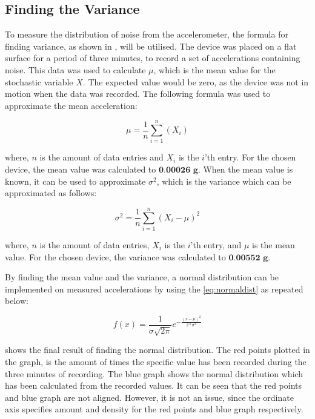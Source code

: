 \subsection{Finding the Variance}\label{section:finding-the-variance}
To measure the distribution of noise from the accelerometer, the formula for finding variance, as shown in , will be utilised.
The device was placed on a flat surface for a period of three minutes, to record a set of accelerations containing noise.
This data was used to calculate $\mu$, which is the mean value for the stochastic variable $X$.
The expected value would be zero, as the device was not in motion when the data was recorded.
The following formula was used to approximate the mean acceleration:

\begin{equation*}
\mu = \frac{1}{n}\sum\limits_{i=1}^n\left(X_i\right)
\end{equation*}
 	
where, $n$ is the amount of data entries and $X_i$ is the $i$'th entry.
For the chosen device, the mean value was calculated to $\textbf{0.00026 g}$.
When the mean value is known, it can be used to approximate $\sigma^2$, which is the variance which can be approximated as follows:

\begin{equation*}
\sigma^2 = \frac{1}{n}\sum\limits_{i=1}^{n}\left( X_i - \mu \right)^2
\end{equation*}

where, $n$ is the amount of data entries, $X_i$ is the $i$'th entry, and $\mu$ is the mean value.
For the chosen device, the variance was calculated to $\textbf{0.00552 g}$.

By finding the mean value and the variance, a normal distribution can be implemented on measured accelerations by using the \eqref{eq:normaldist} as repeated below:

\begin{equation*}
f(x) = \frac{1}{\sigma \sqrt{2\pi}}e^{-\frac{(x - \mu)^2}{2 * \sigma^2}}
\end{equation*}

 shows the final result of finding the normal distribution.
The red points plotted in the graph, is the amount of times the specific value has been recorded during the three minutes of recording.
The blue graph shows the normal distribution which has been calculated from the recorded values.
It can be seen that the red points and blue graph are not aligned.
However, it is not an issue, since the ordinate axis specifies amount and density for the red points and blue graph respectively.

